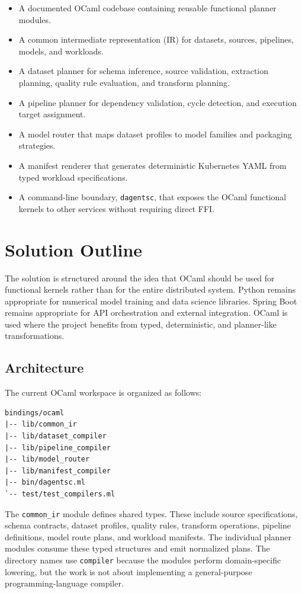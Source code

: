 \documentclass[conference]{IEEEtran}
\begin{document}
\begin{itemize}
  \item A documented OCaml codebase containing reusable functional planner modules.
  \item A common intermediate representation (IR) for datasets, sources,
  pipelines, models, and workloads.
  \item A dataset planner for schema inference, source validation, extraction
  planning, quality rule evaluation, and transform planning.
  \item A pipeline planner for dependency validation, cycle detection, and
  execution target assignment.
  \item A model router that maps dataset profiles to model families and
  packaging strategies.
  \item A manifest renderer that generates deterministic Kubernetes YAML from
  typed workload specifications.
  \item A command-line boundary, \texttt{dagentsc}, that exposes the OCaml
  functional kernels to other services without requiring direct FFI.
\end{itemize}

\section{Solution Outline}

The solution is structured around the idea that OCaml should be used for
functional kernels rather than for the entire distributed system. Python remains
appropriate for numerical model training and data science libraries. Spring
Boot remains appropriate for API orchestration and external integration.
OCaml is used where the project benefits from typed, deterministic, and
planner-like transformations.

\subsection{Architecture}

The current OCaml workspace is organized as follows:

\begin{lstlisting}[style=ocamlstyle]
bindings/ocaml
|-- lib/common_ir
|-- lib/dataset_compiler
|-- lib/pipeline_compiler
|-- lib/model_router
|-- lib/manifest_compiler
|-- bin/dagentsc.ml
`-- test/test_compilers.ml
\end{lstlisting}

The \texttt{common\_ir} module defines shared types. These include source
specifications, schema contracts, dataset profiles, quality rules, transform
operations, pipeline definitions, model route plans, and workload manifests.
The individual planner modules consume these typed structures and emit
normalized plans. The directory names use \texttt{compiler} because the modules
perform domain-specific lowering, but the work is not about implementing a
general-purpose programming-language compiler.
\end{document}
